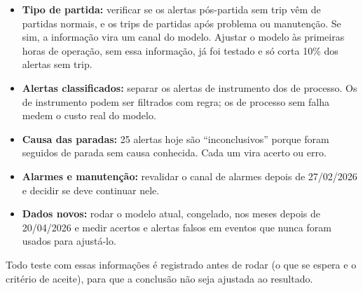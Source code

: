 \documentclass[11pt,a4paper]{article}
\newcommand{\tg}[1]{\texttt{\detokenize{#1}}}
\begin{document}
\begin{itemize}
  \item \textbf{Tipo de partida:} verificar se os alertas pós-partida sem trip vêm de partidas normais, e os trips de
        partidas após problema ou manutenção. Se sim, a informação vira um canal do modelo. Ajustar o modelo às
        primeiras horas de operação, sem essa informação, já foi testado e só corta 10\% dos alertas sem trip.
  \item \textbf{Alertas classificados:} separar os alertas de instrumento dos de processo. Os de instrumento podem ser
        filtrados com regra; os de processo sem falha medem o custo real do modelo.
  \item \textbf{Causa das paradas:} 25 alertas hoje são ``inconclusivos'' porque foram seguidos de parada sem causa
        conhecida. Cada um vira acerto ou erro.
  \item \textbf{Alarmes e manutenção:} revalidar o canal de alarmes depois de 27/02/2026 e decidir se
        \tg{PAL_6240315} deve continuar nele.
  \item \textbf{Dados novos:} rodar o modelo atual, congelado, nos meses depois de 20/04/2026 e medir acertos e
        alertas falsos em eventos que nunca foram usados para ajustá-lo.
\end{itemize}

Todo teste com essas informações é registrado antes de rodar (o que se espera e o critério de aceite), para que a
conclusão não seja ajustada ao resultado.
\end{document}
